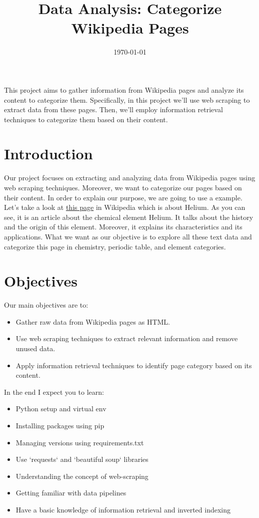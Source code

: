 \documentclass{article}
\title{Data Analysis: Categorize Wikipedia Pages}
\date{\today}
\renewenvironment{abstract}{%
    \small
    \begin{flushleft}%
        \textbf{\abstractname}%
        \vspace{-\baselineskip}%
        \vspace{0.25\baselineskip}%
    \end{flushleft}%
    \list{}{%
        \setlength{\leftmargin}{0.25cm}%
        \setlength{\rightmargin}{\leftmargin}%
    }%
    \item\relax
}{%
    \endlist
}
\begin{document}
\maketitle

\begin{abstract}
This project aims to gather information from Wikipedia pages and analyze its content to categorize them.
Specifically, in this project we'll use web scraping to extract data from these pages. Then, we'll employ information retrieval techniques to categorize them based on their content.
\end{abstract}

\section{Introduction}
Our project focuses on extracting and analyzing data from Wikipedia pages using web scraping techniques. Moreover, we want
to categorize our pages based on their content. In order to explain our purpose, we are going to use a example.
Let's take a look at \href{https://en.wikipedia.org/wiki/Helium}{this page} in Wikipedia which is about Helium.
As you can see, it is an article about the chemical element Helium. It talks about the history and the origin of this element. Moreover, it explains its characteristics
and its applications. What we want as our objective is to explore all these text data and categorize this page in chemistry, periodic table, and element categories.

\section{Objectives}
Our main objectives are to:
\begin{itemize}
    \item Gather raw data from Wikipedia pages as HTML.
    \item Use web scraping techniques to extract relevant information and remove unused data.
    \item Apply information retrieval techniques to identify page category based on its content.
\end{itemize}

In the end I expect you to learn:
\begin{itemize}
    \item Python setup and virtual env
    \item Installing packages using pip
    \item Managing versions using requirements.txt
    \item Use `requests` and `beautiful soup` libraries
    \item Understanding the concept of web-scraping
    \item Getting familiar with data pipelines
    \item Have a basic knowledge of information retrieval and inverted indexing
\end{itemize}
\end{document}
